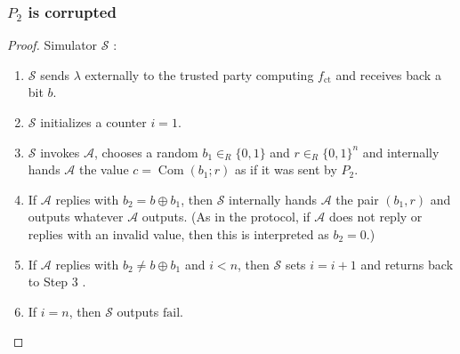 \documentclass{beamer}
\begin{document}
    \begin{frame}
        \frametitle{$P_{2}$ is corrupted}
    
        \begin{proof}
            Simulator $\mathcal{S}$ :
            \begin{enumerate}
                \item $\mathcal{S}$ sends $\lambda$ externally to the trusted party computing $f_{\mathrm{ct}}$ and receives back a bit $b$.
                \item $\mathcal{S}$ initializes a counter $i=1$.
                \item $\mathcal{S}$ invokes $\mathcal{A}$, chooses a random $b_{1} \in_{R}\{0,1\}$ and $r \in_{R}\{0,1\}^{n}$ and internally hands $\mathcal{A}$ the value $c=\operatorname{Com}\left(b_{1} ; r\right)$ as if it was sent by $P_{2}$.
                \item If $\mathcal{A}$ replies with $b_{2}=b \oplus b_{1}$, then $\mathcal{S}$ internally hands $\mathcal{A}$ the pair $\left(b_{1}, r\right)$ and outputs whatever $\mathcal{A}$ outputs. (As in the protocol, if $\mathcal{A}$ does not reply or replies with an invalid value, then this is interpreted as $b_{2}=0$.)
                \item If $\mathcal{A}$ replies with $b_{2} \neq b \oplus b_{1}$ and $i<n$, then $\mathcal{S}$ sets $i=i+1$ and returns back to Step 3 .
                \item  If $i=n$, then $\mathcal{S}$ outputs $\mathrm{fail}$.
            \end{enumerate}
            
        \end{proof}
    
    \end{frame}
\end{document}
